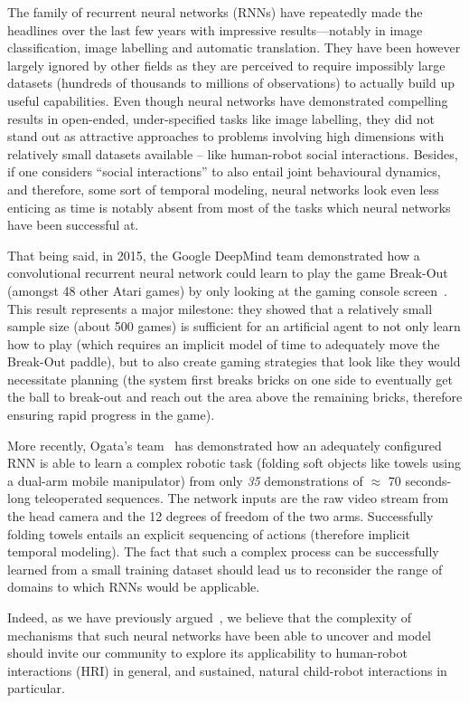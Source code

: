 \documentclass{article}
\begin{document}
The family of recurrent neural networks (RNNs) have repeatedly made the
headlines over the last few years with impressive results---notably in image
classification, image labelling and automatic translation. They have been
however largely ignored by other fields as they are perceived to require
impossibly large datasets (hundreds of thousands to millions of observations) to
actually build up useful capabilities.  Even though neural networks have
demonstrated compelling results in open-ended, under-specified tasks like image
labelling, they did not stand out as attractive approaches to problems involving
high dimensions with relatively small datasets available -- like human-robot
social interactions.  Besides, if one considers ``social interactions'' to also
entail joint behavioural dynamics, and therefore, some sort of temporal
modeling, neural networks look even less enticing as time is notably absent from
most of the tasks which neural networks have been successful at.

That being said, in 2015, the Google DeepMind team demonstrated how a convolutional
recurrent neural network could learn to play the game Break-Out (amongst
48 other Atari games) by only looking at the gaming console
screen~\cite{mnih2015human}. This result represents a major milestone: they showed
that a relatively small sample size (about 500 games) is sufficient for an 
artificial agent to not only learn how to play (which requires an implicit model 
of time to adequately move the Break-Out paddle), but to also create gaming 
strategies that look like they would necessitate planning (the system first
breaks bricks on one side to eventually get the ball to break-out and reach out the area
above the remaining bricks, therefore ensuring rapid progress in the
game).

More recently, Ogata's team~\cite{yang2017repeatable} has demonstrated how an
adequately configured RNN is able to learn a complex robotic task (folding soft
objects like towels using a dual-arm mobile manipulator) from only \emph{35}
demonstrations of $\approx$ 70 seconds-long teleoperated
sequences. The network inputs are the raw video stream from the head camera and the
12 degrees of freedom of the two arms. Successfully folding towels entails an explicit sequencing of
actions (therefore implicit temporal modeling). The fact that such a complex
process can be successfully learned from a small training dataset should lead
us to reconsider the range of domains to which RNNs would be applicable.

Indeed, as we have previously argued~\cite{lemaignan2016towards}, we believe
that the complexity of mechanisms that such neural networks have been able to
uncover and model should invite our community to explore its applicability to
human-robot interactions (HRI) in general, and sustained, natural child-robot
interactions in particular.
\end{document}
